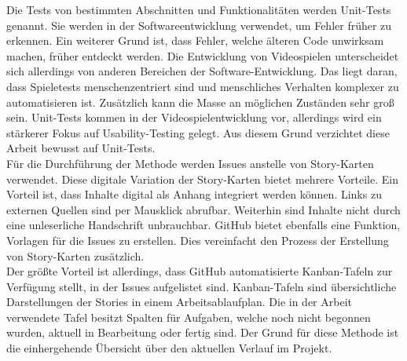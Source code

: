 Die Tests von bestimmten Abschnitten und Funktionalitäten werden Unit-Tests genannt\cite{unit-tests}. Sie werden in der Softwareentwicklung verwendet, um Fehler früher zu erkennen. Ein weiterer Grund ist, dass Fehler, welche älteren Code unwirksam machen, früher entdeckt werden. Die Entwicklung von Videospielen unterscheidet sich allerdings von anderen Bereichen der Software-Entwicklung\cite{difference-development}. Das liegt daran, dass Spieletests menschenzentriert sind und menschliches Verhalten komplexer zu automatisieren ist\cite{testing-game-dev}. Zusätzlich kann die Masse an möglichen Zuständen sehr groß sein. Unit-Tests kommen in der Videospielentwicklung vor, allerdings wird ein stärkerer Fokus auf Usability-Testing gelegt\cite{no-unit-tests}. Aus diesem Grund verzichtet diese Arbeit bewusst auf Unit-Tests.\\

Für die Durchführung der Methode werden Issues\cite{github-issues} anstelle von Story-Karten verwendet. Diese digitale Variation der Story-Karten bietet mehrere Vorteile. Ein Vorteil ist, dass Inhalte digital als Anhang integriert werden können. Links zu externen Quellen sind per Mausklick abrufbar. Weiterhin sind Inhalte nicht durch eine unleserliche Handschrift unbrauchbar. GitHub bietet ebenfalls eine Funktion, Vorlagen für die Issues zu erstellen. Dies vereinfacht den Prozess der Erstellung von Story-Karten zusätzlich.\\

Der größte Vorteil ist allerdings, dass GitHub automatisierte Kanban-Tafeln zur Verfügung stellt, in der Issues aufgelistet sind\cite{github-kanban}. Kanban-Tafeln sind übersichtliche Darstellungen der Stories in einem Arbeitsablaufplan\cite{kanban-oreilly}. Die in der Arbeit verwendete Tafel besitzt Spalten für Aufgaben, welche noch nicht begonnen wurden, aktuell in Bearbeitung oder fertig sind. Der Grund für diese Methode ist die einhergehende Übersicht über den aktuellen Verlauf im Projekt. 

